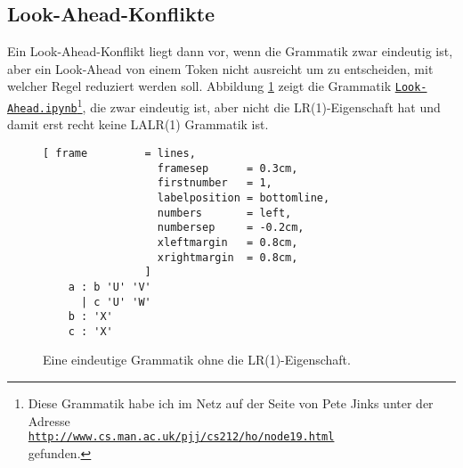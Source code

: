 \subsection{Look-Ahead-Konflikte}
Ein Look-Ahead-Konflikt liegt dann vor, wenn die Grammatik zwar eindeutig ist, aber ein Look-Ahead von einem
Token nicht ausreicht um zu entscheiden,  mit welcher Regel reduziert werden soll.  Abbildung 
\ref{fig:lr-conflict.g} zeigt die Grammatik 
\href{https://github.com/karlstroetmann/Formal-Languages/blob/master/Ply/Look-Ahead.ipynb}{\texttt{Look-Ahead.ipynb}}\footnote{ 
Diese Grammatik habe ich im Netz auf der Seite von Pete Jinks unter der Adresse
\\[0.1cm]
\hspace*{1.3cm}
\href{http://www.cs.man.ac.uk/~pjj/cs212/ho/node19.html}{\texttt{http://www.cs.man.ac.uk/pjj/cs212/ho/node19.html}}
\\[0.1cm]
gefunden.},
die zwar eindeutig ist, aber nicht die LR(1)-Eigenschaft hat und damit erst recht keine LALR(1) Grammatik ist.

\begin{figure}[!ht]
\centering
\begin{Verbatim}[ frame         = lines, 
                  framesep      = 0.3cm, 
                  firstnumber   = 1,
                  labelposition = bottomline,
                  numbers       = left,
                  numbersep     = -0.2cm,
                  xleftmargin   = 0.8cm,
                  xrightmargin  = 0.8cm,
                ]
    a : b 'U' 'V'
      | c 'U' 'W'
    b : 'X'
    c : 'X'   
\end{Verbatim}
\vspace*{-0.3cm}
\caption{Eine eindeutige Grammatik ohne die LR(1)-Eigenschaft.}
\label{fig:lr-conflict.g}
\end{figure}


